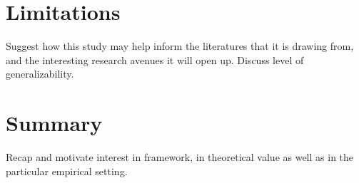 \documentclass[12pt,letterpaper]{article}
\begin{document}
\section{Limitations}
Suggest how this study may help inform the literatures that it is drawing from, and the interesting research avenues it will open up. Discuss level of generalizability.

\section{Summary}
Recap and motivate interest in framework, in theoretical value as well as in the particular empirical setting.


\begin{comment}
\section{Notes}

\end{comment}

\begin{singlespace}
\renewcommand{\refname}{REFERENCES}
 

\end{singlespace}
\end{document}
